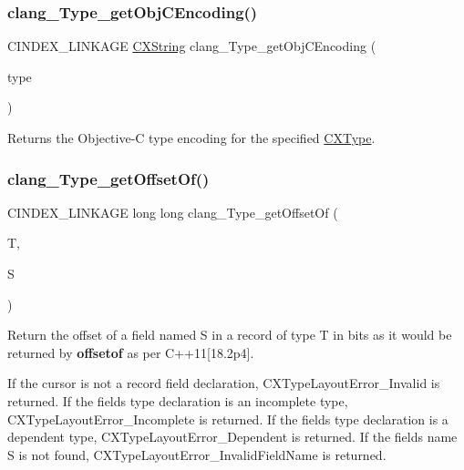 \subsubsection{\texorpdfstring{clang\+\_\+\+Type\+\_\+get\+Obj\+C\+Encoding()}{clang\_Type\_getObjCEncoding()}}
{\footnotesize\ttfamily C\+I\+N\+D\+E\+X\+\_\+\+L\+I\+N\+K\+A\+GE \mbox{\hyperlink{structCXString}{C\+X\+String}} clang\+\_\+\+Type\+\_\+get\+Obj\+C\+Encoding (\begin{DoxyParamCaption}\item[{\mbox{\hyperlink{structCXType}{C\+X\+Type}}}]{type }\end{DoxyParamCaption})}

Returns the Objective-\/C type encoding for the specified \mbox{\hyperlink{structCXType}{C\+X\+Type}}. \mbox{\label{group__CINDEX__TYPES_gab543536d5c18efb3e23a1b7903fb494d}} 
\subsubsection{\texorpdfstring{clang\+\_\+\+Type\+\_\+get\+Offset\+Of()}{clang\_Type\_getOffsetOf()}}
{\footnotesize\ttfamily C\+I\+N\+D\+E\+X\+\_\+\+L\+I\+N\+K\+A\+GE long long clang\+\_\+\+Type\+\_\+get\+Offset\+Of (\begin{DoxyParamCaption}\item[{\mbox{\hyperlink{structCXType}{C\+X\+Type}}}]{T,  }\item[{const char $\ast$}]{S }\end{DoxyParamCaption})}



Return the offset of a field named S in a record of type T in bits as it would be returned by {\bfseries offsetof} as per C++11\mbox{[}18.\+2p4\mbox{]}. 

If the cursor is not a record field declaration, C\+X\+Type\+Layout\+Error\+\_\+\+Invalid is returned. If the field\textquotesingle{}s type declaration is an incomplete type, C\+X\+Type\+Layout\+Error\+\_\+\+Incomplete is returned. If the field\textquotesingle{}s type declaration is a dependent type, C\+X\+Type\+Layout\+Error\+\_\+\+Dependent is returned. If the field\textquotesingle{}s name S is not found, C\+X\+Type\+Layout\+Error\+\_\+\+Invalid\+Field\+Name is returned. \mbox{\label{group__CINDEX__TYPES_ga027abe334546e80931905f31399d0a8b}} 
